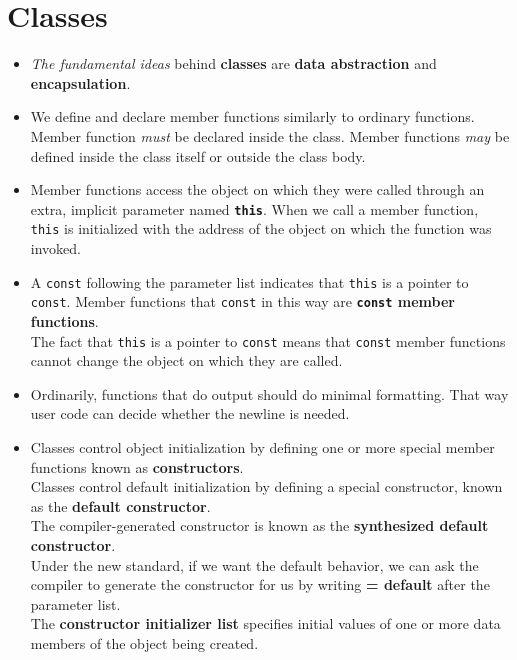 \section{Classes}
\begin{itemize}

\item
\textit{The fundamental ideas} behind \textbf{classes} are \textbf{data abstraction} and \textbf{encapsulation}.

\item
We define and declare member functions similarly to ordinary functions. Member function \textit{must} be declared inside the class. Member functions \textit{may} be defined inside the class itself or outside the class body.

\item
Member functions access the object on which they were called through an extra, implicit parameter named \textbf{\texttt{this}}. When we call a member function, \texttt{this} is initialized with the address of the object on which the function was invoked.

\item
A \texttt{const} following the parameter list indicates that \texttt{this} is a pointer to \texttt{const}. Member functions that \texttt{const} in this way are \textbf{\texttt{const} member functions}.\\
The fact that \texttt{this} is a pointer to \texttt{const} means that \texttt{const} member functions cannot change the object on which they are called.

\item
Ordinarily, functions that do output should do minimal formatting. That way user code can decide whether the newline is needed.

\item
Classes control object initialization by defining one or more special member functions known as \textbf{constructors}.\\
Classes control default initialization by defining a special constructor, known as the \textbf{default constructor}.\\
The compiler-generated constructor is known as the \textbf{synthesized default constructor}.\\
Under the new standard, if we want the default behavior, we can ask the compiler to generate the constructor for us by writing \textbf{= default} after the parameter list.\\
The \textbf{constructor initializer list} specifies initial values of one or more data members of the object being created.


\end{itemize}
